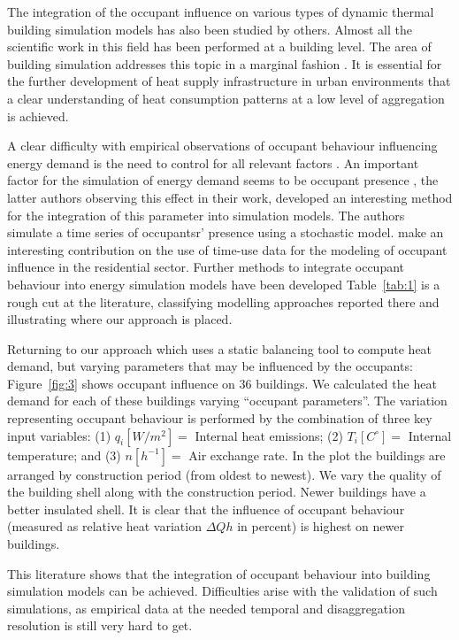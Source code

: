 \documentclass[11pt]{IJM-article}
\begin{document}
The integration of the occupant influence on various types of dynamic thermal
building simulation models has also been studied by others. Almost all the
scientific work in this field has been performed at a building level. The area
of building simulation addresses this topic in a marginal fashion
. It is essential for the further development of heat
supply infrastructure in urban environments that a clear understanding of heat
consumption patterns at a low level of aggregation is achieved.

A clear difficulty with empirical observations of occupant behaviour
influencing energy demand is the need to control for all relevant factors
. An important factor for the simulation of energy demand seems
to be occupant presence , the latter authors observing
this effect in their work,  developed an interesting method
for the integration of this parameter into simulation models.  The authors
simulate a time series of occupantsr' presence using a stochastic model.
 make an interesting contribution on the use of time-use data
for the modeling of occupant influence in the residential sector. Further
methods to integrate occupant behaviour into energy simulation models have been
developed  Table~\ref{tab:1} is a rough cut at the literature, classifying
modelling approaches reported there and illustrating where our approach is
placed.

Returning to our approach which uses a static balancing tool to compute heat
demand, but varying parameters that may be influenced by the occupants:
Figure~\ref{fig:3} shows occupant influence on 36 buildings.  We calculated the
heat demand for each of these buildings varying ``occupant parameters''. The
variation representing occupant behaviour is performed by the combination of
three key input variables: (1) $q_i[W/m^2] = $ Internal heat emissions; (2)
$T_i[C^\circ] = $ Internal temperature; and (3) $n[h^{-1}] = $ Air exchange
rate. In the plot the buildings are arranged by construction period (from
oldest to newest). We vary the quality of the building shell along with the
construction period. Newer buildings have a better insulated shell. It is clear
that the influence of occupant behaviour (measured as relative heat variation
$\Delta Qh$ in percent) is highest on newer buildings.

This literature shows that the integration of occupant behaviour into building
simulation models can be achieved. Difficulties arise with the validation of
such simulations, as empirical data at the needed temporal and disaggregation
resolution is still very hard to get.
\end{document}
